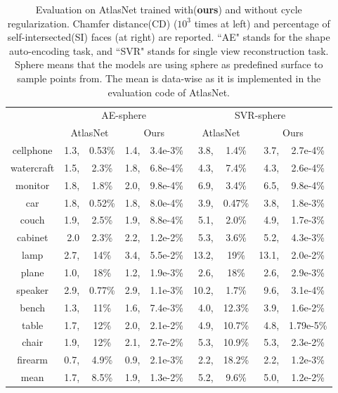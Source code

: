 \begin{table}
	\caption{Evaluation on AtlasNet trained with(\textbf{ours}) and without cycle regularization. Chamfer distance(CD) ($10^3$ times at left) and percentage of self-intersected(SI) faces (at right) are reported. ``AE" stands for the shape auto-encoding task, and ``SVR" stands for single view reconstruction task. Sphere means that the models are using sphere as predefined surface to sample points from. The mean is data-wise as it is implemented in the evaluation code of AtlasNet.}
	\label{tab:atlas}
	\centering
	\begin{tabular}{|c|rc|rc|rc|rc|}
		\hline 
		~&\multicolumn{4}{c|}{AE-sphere}&\multicolumn{4}{c|}{SVR-sphere}\\
		\cline{2-9}
		~& \multicolumn{2}{c|}{AtlasNet} & \multicolumn{2}{c|}{Ours} & \multicolumn{2}{c|}{AtlasNet} & \multicolumn{2}{c|}{Ours} \\
		\hline
		cellphone&1.3,&0.53\%&1.4,&3.4e-3\%&3.8,&1.4\%&3.7,&2.7e-4\%\\
		watercraft&1.5,&2.3\%&1.8,&6.8e-4\%&4.3,&7.4\%&4.3,&2.6e-4\%\\
		monitor&1.8,&1.8\%&2.0,&9.8e-4\%&6.9,&3.4\%&6.5,&9.8e-4\%\\
		car&1.8,&0.52\%&1.8,&8.0e-4\%&3.9,&0.47\%&3.8,&1.8e-3\%\\
		couch&1.9,&2.5\%&1.9,&8.8e-4\%&5.1,&2.0\%&4.9,&1.7e-3\%\\
		cabinet&2.0&2.3\%&2.2,&1.2e-2\%&5.3,&3.6\%&5.2,&4.3e-3\%\\
		lamp&2.7,&14\%&3.4,&5.5e-2\%&13.2,&19\%&13.1,&2.0e-2\%\\
		plane&1.0,&18\%&1.2,&1.9e-3\%&2.6,&18\%&2.6,&2.9e-3\%\\
		speaker&2.9,&0.77\%&2.9,&1.1e-3\%&10.2,&1.7\%&9.6,&3.1e-4\%\\
		bench&1.3,&11\%&1.6,&7.4e-3\%&4.0,&12.3\%&3.9,&1.6e-2\%\\
		table&1.7,&12\%&2.0,&2.1e-2\%&4.9,&10.7\%&4.8,&1.79e-5\%\\
		chair&1.9,&12\%&2.1,&2.7e-2\%&5.3,&10.9\%&5.3,&2.3e-2\%\\
		firearm&0.7,&4.9\%&0.9,&2.1e-3\%&2.2,&18.2\%&2.2,&1.2e-3\%\\
		\hline
		mean &1.7,&8.5\%&1.9,& 1.3e-2\% &5.2,&9.6\%&5.0,&1.2e-2\%\\
		\hline
	\end{tabular}
\end{table}
